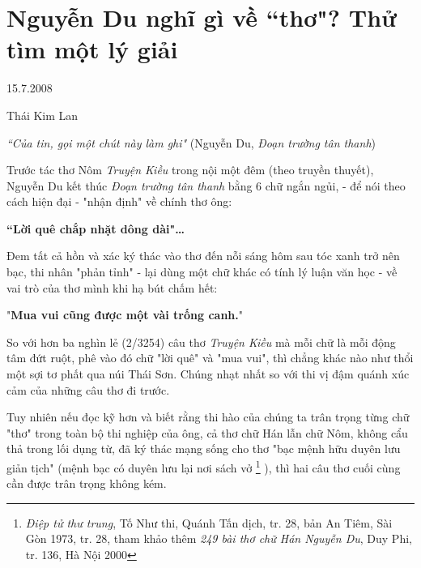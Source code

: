 \documentclass[../main.tex]{subfiles}
\begin{document}
\chapter{Nguyễn Du nghĩ gì về “thơ"? Thử tìm một lý giải}

\begin{metadata}

\begin{flushright}15.7.2008\end{flushright}

Thái Kim Lan



\end{metadata}

\begin{multicols}{2}

\begin{blockquote}

\textit{“Của tin, gọi một chút này làm ghi"}        
(Nguyễn Du, \textit{Đoạn trường tân thanh}) 

\end{blockquote}
 
Trước tác thơ Nôm \textit{Truyện Kiều} trong nội một đêm (theo truyền thuyết), Nguyễn Du kết thúc \textit{Đoạn trường tân thanh }bằng 6 chữ ngắn ngủi, - để nói theo cách hiện đại - "nhận định" về chính thơ ông:   
 
\textbf{“Lời quê chắp nhặt dông dài"…} 
 
Đem tất cả hồn và xác ký thác vào thơ đến nỗi sáng hôm sau tóc xanh trở nên bạc, thi nhân "phản tỉnh" - lại dùng một chữ khác có tính lý luận văn học -  về vai trò của thơ mình khi hạ bút chấm hết:  
 
"\textbf{Mua vui cũng được một vài trống canh.}" 
 
So với hơn ba nghìn lẻ (2/3254) câu thơ \textit{Truyện Kiều} mà mỗi chữ là mỗi động tâm đứt ruột, phê vào đó chữ "lời quê" và "mua vui", thì chẳng khác nào như thổi một sợi tơ phất qua núi Thái Sơn. Chúng nhạt nhất so với thi vị đậm quánh xúc cảm của những câu thơ đi trước. 
 
Tuy nhiên nếu đọc kỹ hơn và biết rằng thi hào của chúng ta trân trọng từng chữ "thơ" trong toàn bộ thi nghiệp của ông, cả thơ chữ Hán lẫn chữ Nôm, không cẩu thả trong lối dụng từ, đã ký thác mạng sống cho thơ "bạc mệnh hữu duyên lưu giản tịch" (mệnh bạc có duyên lưu lại nơi sách vở \footnote{
\textit{Điệp tử thư trung}, Tố Như thi, Quánh Tấn dịch, tr. 28, bản An Tiêm, Sài Gòn 1973, tr. 28, tham khảo thêm \textit{249 bài thơ chữ Hán Nguyễn Du}, Duy Phi, tr. 136, Hà Nội 2000} ), thì hai câu thơ cuối cùng cần được trân trọng không kém.  
 

\end{multicols}
\end{document}
